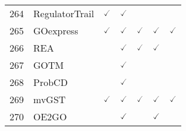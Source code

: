 \documentclass[10pt,letterpaper]{article}
\begin{document}
\begin{table}[!ht]
\begin{adjustwidth}{-2.25in}{0in}
\begin{tabular}{|c|l|c|c|c|c|c|}
264 & RegulatorTrail\cite{kehl2017regulatortrail} & $\checked$ & $\checked$ & & & \\
265 & GOexpress\cite{rue2016goexpress} & $\checked$ & $\checked$ & $\checked$ & $\checked$ & $\checked$  \\ 
266 & REA\cite{erhard2012rip} & & $\checked$ & $\checked$ & $\checked$ & \\ 
267 & GOTM\cite{zhang2004gotree} & & $\checked$ & & & \\ 
268 & ProbCD\cite{vencio2007probcd} & & $\checked$ & & & \\ 
269 & mvGST\cite{mecham2014mvgst} & $\checked$ & $\checked$ & $\checked$ & $\checked$ & $\checked$  \\ 
270 & OE2GO\cite{khatri2007onto} & & $\checked$ & & $\checked$ & \\ \hline
\end{tabular}
\label{table1}
\end{adjustwidth}
\end{table}
\end{document}
